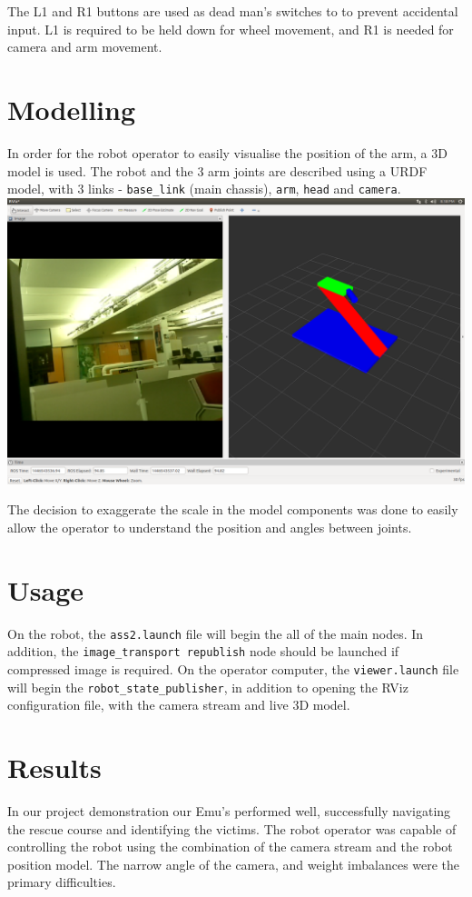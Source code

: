 \documentclass[titlepage,12pt,a4paper]{article}
\begin{document}
\noindent The L1 and R1 buttons are used as dead man's switches to to prevent accidental input. L1 is required to be held down for wheel movement, and R1 is needed for camera and arm movement.\\

\section{Modelling}
In order for the robot operator to easily visualise the position of the arm, a 3D model is used. The robot and the 3 arm joints are described using a URDF model, with 3 links - \texttt{base\_link} (main chassis), \texttt{arm}, \texttt{head} and \texttt{camera}.\\

\noindent \includegraphics[width=\textwidth]{rviz}

\noindent The decision to exaggerate the scale in the model components was done to easily allow the operator to understand the position and angles between joints.

\section{Usage}
On the robot, the \texttt{ass2.launch} file will begin the all of the main nodes. In addition, the \texttt{image\_transport republish} node should be launched if compressed image is required. On the operator computer, the \texttt{viewer.launch} file will begin the \texttt{robot\_state\_publisher}, in addition to opening the RViz configuration file, with the camera stream and live 3D model.

\section{Results}
In our project demonstration our Emu's performed well, successfully navigating the rescue course and identifying the victims. The robot operator was capable of controlling the robot using the combination of the camera stream and the robot position model. The narrow angle of the camera, and weight imbalances were the primary difficulties.
\end{document}
